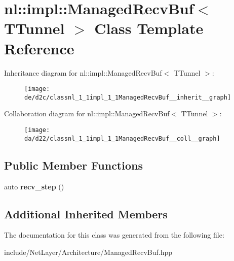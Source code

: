 \hypertarget{classnl_1_1impl_1_1ManagedRecvBuf}{}\section{nl\+:\+:impl\+:\+:Managed\+Recv\+Buf$<$ T\+Tunnel $>$ Class Template Reference}
\label{classnl_1_1impl_1_1ManagedRecvBuf}


Inheritance diagram for nl\+:\+:impl\+:\+:Managed\+Recv\+Buf$<$ T\+Tunnel $>$\+:\nopagebreak
\begin{figure}[H]
\begin{center}
\leavevmode
\texttt{[image: de/d2c/classnl\_1\_1impl\_1\_1ManagedRecvBuf\_\_inherit\_\_graph]}
\end{center}
\end{figure}


Collaboration diagram for nl\+:\+:impl\+:\+:Managed\+Recv\+Buf$<$ T\+Tunnel $>$\+:\nopagebreak
\begin{figure}[H]
\begin{center}
\leavevmode
\texttt{[image: da/d22/classnl\_1\_1impl\_1\_1ManagedRecvBuf\_\_coll\_\_graph]}
\end{center}
\end{figure}
\subsection*{Public Member Functions}
\begin{DoxyCompactItemize}
\item 
\hypertarget{classnl_1_1impl_1_1ManagedRecvBuf_a0ea2535503e7c1116ccbee2c501c813a}{}auto {\bfseries recv\+\_\+step} ()\label{classnl_1_1impl_1_1ManagedRecvBuf_a0ea2535503e7c1116ccbee2c501c813a}

\end{DoxyCompactItemize}
\subsection*{Additional Inherited Members}


The documentation for this class was generated from the following file\+:\begin{DoxyCompactItemize}
\item 
include/\+Net\+Layer/\+Architecture/Managed\+Recv\+Buf.\+hpp\end{DoxyCompactItemize}
